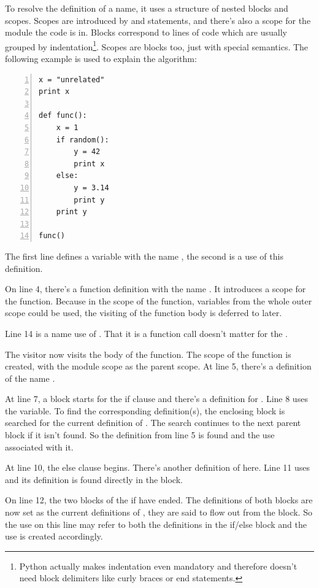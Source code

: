 \documentclass[12pt,halfparskip]{scrreprt}
\begin{document}
To resolve the definition of a name, it uses a structure of nested blocks and scopes. Scopes are introduced by  and  statements, and there's also a scope for the module the code is in. Blocks correspond to lines of code which are usually grouped by indentation\footnote{Python actually makes indentation even mandatory and therefore doesn't need block delimiters like curly braces or end statements.}. Scopes are blocks too, just with special semantics. The following example is used to explain the algorithm:

\begin{lstlisting}[numbers=left]
x = "unrelated"
print x

def func():
    x = 1
    if random():
        y = 42
        print x
    else:
        y = 3.14
        print y
    print y

func()
\end{lstlisting}

The first line defines a variable with the name , the second is a use of this definition.

On line 4, there's a function definition with the name . It introduces a scope for the function. Because in the scope of the function, variables from the whole outer scope could be used, the visiting of the function body is deferred to later.

Line 14 is a name use of . That it is a function call doesn't matter for the .

The visitor now visits the body of the function. The scope of the function is created, with the module scope as the parent scope. At line 5, there's a definition of the name .

At line 7, a block starts for the if clause and there's a definition for . Line 8 uses the  variable. To find the corresponding definition(s), the enclosing block is searched for the current definition of . The search continues to the next parent block if it isn't found. So the definition from line 5 is found and the use associated with it.

At line 10, the else clause begins. There's another definition of  here. Line 11 uses  and its definition is found directly in the block.

On line 12, the two blocks of the if have ended. The definitions of both blocks are now set as the current definitions of , they are said to flow out from the block. So the use on this line may refer to both the definitions in the if/else block and the use is created accordingly.
\end{document}
